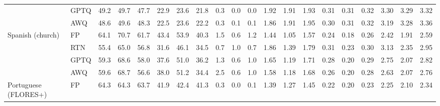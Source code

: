\begin{landscape}
\begin{longtable}{llrrrrrrrrrrrrrrrrrr}
 & GPTQ & \cellcolor{loss!6}49.2 & \cellcolor{loss!4}49.7 & \cellcolor{loss!7}47.7 & \cellcolor{loss!10}22.9 & \cellcolor{loss!8}23.6 & \cellcolor{loss!13}21.8 & \cellcolor{loss!0}0.3 & 0.0 & 0.0 & \cellcolor{loss!2}1.92 & \cellcolor{loss!2}1.91 & \cellcolor{loss!1}1.93 & \cellcolor{loss!2}0.31 & \cellcolor{loss!2}0.31 & \cellcolor{loss!2}0.32 & \cellcolor{loss!0}3.30 & \cellcolor{loss!0}3.29 & \cellcolor{loss!0}3.32 \\
 & AWQ & \cellcolor{loss!7}48.6 & \cellcolor{loss!4}49.6 & \cellcolor{loss!6}48.3 & \cellcolor{loss!11}22.5 & \cellcolor{loss!7}23.6 & \cellcolor{loss!12}22.2 & \cellcolor{loss!0}0.3 & 0.1 & \cellcolor{loss!0}0.1 & \cellcolor{loss!1}1.86 & \cellcolor{loss!2}1.91 & \cellcolor{loss!1}1.95 & \cellcolor{loss!2}0.30 & \cellcolor{loss!2}0.31 & \cellcolor{loss!2}0.32 & \cellcolor{loss!0}3.19 & \cellcolor{loss!0}3.28 & \cellcolor{loss!0}3.36 \\
\midrule
Spanish (church) & FP & 64.1 & 70.7 & 61.7 & 43.4 & 53.9 & 40.3 & 1.5 & 0.6 & 1.2 & 1.44 & 1.05 & 1.57 & 0.24 & 0.18 & 0.26 & 2.42 & 1.91 & 2.59 \\
 & RTN & \cellcolor{loss!19}55.4 & \cellcolor{loss!12}65.0 & \cellcolor{loss!10}56.8 & \cellcolor{loss!43}31.6 & \cellcolor{loss!28}46.1 & \cellcolor{loss!21}34.5 & 0.7 & \cellcolor{loss!0}1.0 & 0.7 & \cellcolor{loss!4}1.86 & \cellcolor{loss!3}1.39 & \cellcolor{loss!2}1.79 & \cellcolor{loss!5}0.31 & \cellcolor{loss!4}0.23 & \cellcolor{loss!3}0.30 & \cellcolor{loss!0}3.13 & \cellcolor{loss!0}2.35 & \cellcolor{loss!0}2.95 \\
 & GPTQ & \cellcolor{loss!10}59.3 & \cellcolor{loss!4}68.6 & \cellcolor{loss!8}58.0 & \cellcolor{loss!21}37.6 & \cellcolor{loss!11}51.0 & \cellcolor{loss!15}36.2 & 1.3 & 0.6 & 1.0 & \cellcolor{loss!2}1.65 & \cellcolor{loss!1}1.19 & \cellcolor{loss!1}1.71 & \cellcolor{loss!3}0.28 & \cellcolor{loss!1}0.20 & \cellcolor{loss!2}0.29 & \cellcolor{loss!0}2.75 & \cellcolor{loss!0}2.07 & \cellcolor{loss!0}2.82 \\
 & AWQ & \cellcolor{loss!10}59.6 & \cellcolor{loss!4}68.7 & \cellcolor{loss!11}56.6 & \cellcolor{loss!20}38.0 & \cellcolor{loss!10}51.2 & \cellcolor{loss!21}34.4 & \cellcolor{loss!1}2.5 & 0.6 & 1.0 & \cellcolor{loss!1}1.58 & \cellcolor{loss!1}1.18 & \cellcolor{loss!1}1.68 & \cellcolor{loss!2}0.26 & \cellcolor{loss!1}0.20 & \cellcolor{loss!1}0.28 & \cellcolor{loss!0}2.63 & \cellcolor{loss!0}2.07 & \cellcolor{loss!0}2.76 \\
\midrule
Portuguese (FLORES+) & FP & 64.3 & 64.3 & 63.7 & 41.9 & 42.4 & 41.3 & 0.3 & 0.0 & 0.1 & 1.39 & 1.27 & 1.45 & 0.22 & 0.20 & 0.23 & 2.25 & 2.10 & 2.34 \\

\end{longtable}
\end{landscape}
